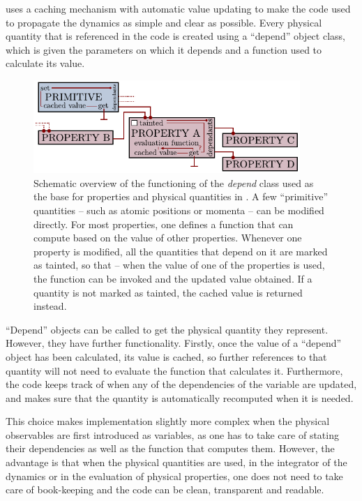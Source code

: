 \documentclass[11pt,english,fleqn]{report}
\begin{document}
\ipi uses a caching mechanism with automatic value updating to make
the code used to propagate the dynamics as simple and clear as possible.
Every physical quantity that is referenced in the code is created
using a {}``depend'' object class, which is given the parameters
on which it depends and a function used to calculate its value. 

\begin{figure}[hpbt]
\centering\includegraphics[width=0.9\textwidth]{figures/ipi-depend.pdf}
\caption{\label{fig:depend} Schematic overview of the functioning of the 
\emph{depend} class used as the base for properties and physical quantities in \ipi{}. 
A few ``primitive'' quantities -- such as atomic positions or momenta -- can be modified
directly. For most properties, one defines a function that can compute based on the
value of other properties. Whenever one property is modified, all the quantities that
depend on it are marked as tainted, so that -- when the value of one of the properties
is used, the function can be invoked and the updated value obtained. If a quantity
is not marked as tainted, the cached value is returned instead. 
}
\end{figure}


{}``Depend'' objects can be called to get the physical quantity
they represent. However, they have further functionality. Firstly,
once the value of a {}``depend'' object has been calculated, its
value is cached, so further references to that quantity will not need
to evaluate the function that calculates it. Furthermore, the code
keeps track of when any of the dependencies of the variable are updated,
and makes sure that the quantity is automatically recomputed when
it is needed. 

This choice makes implementation slightly more complex when the physical
observables are first introduced as variables, as one has to take
care of stating their dependencies as well as the function that computes
them. However, the advantage is that when the physical quantities
are used, in the integrator of the dynamics or in the evaluation of
physical properties, one does not need to take care of book-keeping
and the code can be clean, transparent and readable.
\end{document}
